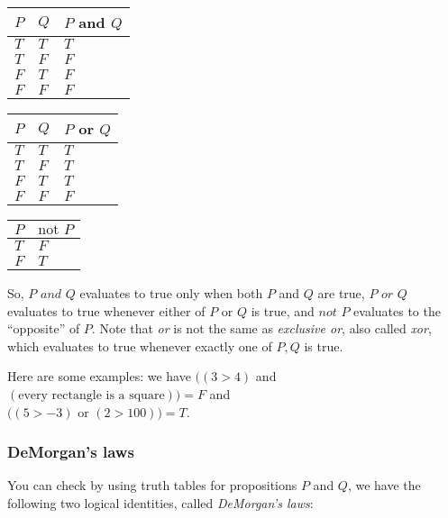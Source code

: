 \begin{table}[H]
    \centering
    \begin{tabular}{|l|l|l|}
    \hline
    $P$ & $Q$ & $P$ and $Q$ \\ \hline
    $T$ & $T$ & $T$        \\ \hline
    $T$ & $F$ & $F$        \\ \hline
    $F$ & $T$ & $F$        \\ \hline
    $F$ & $F$ & $F$        \\ \hline
    \end{tabular}
    \quad
    \begin{tabular}{|l|l|l|}
    \hline
    $P$ & $Q$ & $P$ or $Q$ \\ \hline
    $T$ & $T$ & $T$        \\ \hline
    $T$ & $F$ & $T$        \\ \hline
    $F$ & $T$ & $T$        \\ \hline
    $F$ & $F$ & $F$        \\ \hline
    \end{tabular}
    \quad
    \begin{tabular}{|l|l|}
    \hline
    $P$ & $\text{not } P$ \\ \hline
    $T$ & $F$      \\ \hline
    $F$ & $T$      \\ \hline
    \end{tabular}
\end{table}

So, $P \textit{ and } Q$ evaluates to true only when both $P$ and $Q$ are true, $P \textit{ or } Q$ evaluates to true whenever either of $P$ or $Q$ is true, and $\textit{not } P$ evaluates to the ``opposite'' of $P$. Note that \textit{or} is not the same as \textit{exclusive or}, also called \textit{xor}, which evaluates to true whenever exactly one of $P, Q$ is true.

Here are some examples: we have $\Big((3 > 4)$ and $(\text{every rectangle is a square}) \Big) = F$ and \\ $\Big((5 > -3) \text{ or } (2 > 100)\Big) = T$.

\subsubsection*{DeMorgan's laws}

You can check by using truth tables for propositions $P$ and $Q$, we have the following two logical identities, called \textit{DeMorgan's laws}:

